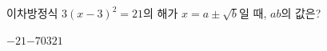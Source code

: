 이차방정식 $3(x-3)^2=21$의 해가 $x=a\pm\sqrt{b}$일 때, $ab$의 값은? 
\begin{choices32}{$-21$}{$-7$}{$0$}{$3$}{$21$}\end{choices32}
